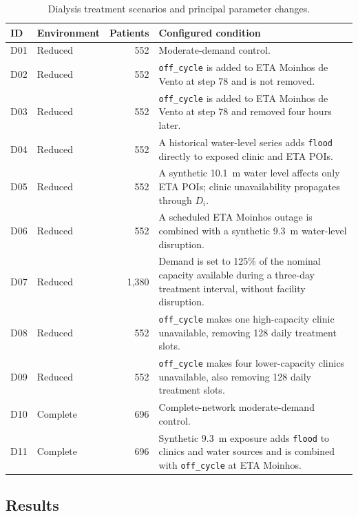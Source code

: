 \begin{table}[ht]
\centering
\footnotesize
\caption{Dialysis treatment scenarios and principal parameter changes.}
\label{tbl:dialysis_scenarios}
\begin{tabularx}{\linewidth}{@{}llrX@{}}
\toprule
\textbf{ID} & \textbf{Environment} &
\textbf{Patients} & \textbf{Configured condition} \\ \midrule
D01 & Reduced  & 552  & Moderate-demand control. \\ \midrule
D02 & Reduced  & 552  & \texttt{off\_cycle} is added to ETA Moinhos de Vento at step 78 and is not removed. \\ \midrule
D03 & Reduced  & 552  & \texttt{off\_cycle} is added to ETA Moinhos de Vento at step 78 and removed four hours later. \\ \midrule
D04 & Reduced  & 552  & A historical water-level series adds \texttt{flood} directly to exposed clinic and ETA POIs. \\ \midrule
D05 & Reduced  & 552  & A synthetic 10.1~m water level affects only ETA POIs; clinic unavailability propagates through $D_i$. \\ \midrule
D06 & Reduced  & 552  & A scheduled ETA Moinhos outage is combined with a synthetic 9.3~m water-level disruption. \\ \midrule
D07 & Reduced  & 1,380 & Demand is set to 125\% of the nominal capacity available during a three-day treatment interval, without facility disruption. \\ \midrule
D08 & Reduced  & 552  & \texttt{off\_cycle} makes one high-capacity clinic unavailable, removing 128 daily treatment slots. \\ \midrule
D09 & Reduced  & 552  & \texttt{off\_cycle} makes four lower-capacity clinics unavailable, also removing 128 daily treatment slots. \\ \midrule
D10 & Complete & 696  & Complete-network moderate-demand control. \\ \midrule
D11 & Complete & 696  & Synthetic 9.3~m exposure adds \texttt{flood} to clinics and water sources and is combined with \texttt{off\_cycle} at ETA Moinhos. \\ \bottomrule
\end{tabularx}
\end{table}

\subsection{Results}

